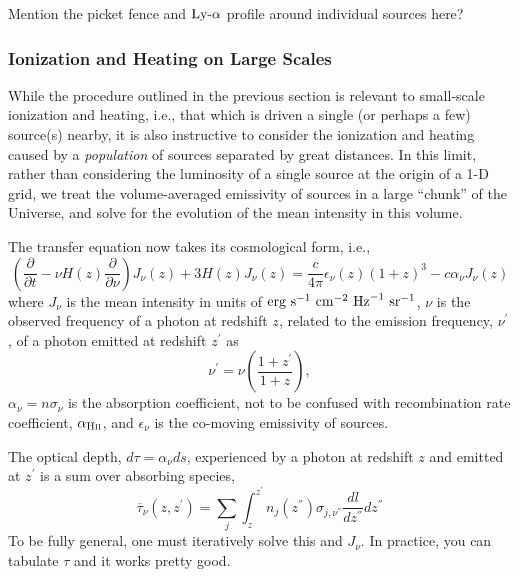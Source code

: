 {\color{red} Mention the picket fence and $\text{Ly-}\alpha$ profile around individual sources here?}

%



\subsubsection{Ionization and Heating on Large Scales} \label{sec:largescales}
While the procedure outlined in the previous section is relevant to small-scale ionization and heating, i.e., that which is driven a single (or perhaps a few) source(s) nearby, it is also instructive to consider the ionization and heating caused by a \textit{population} of sources separated by great distances. In this limit, rather than considering the luminosity of a single source at the origin of a 1-D grid, we treat the volume-averaged emissivity of sources in a large ``chunk'' of the Universe, and solve for the evolution of the mean intensity in this volume. 

The transfer equation now takes its cosmological form, i.e., 
\begin{equation}
    \left(\frac{\partial}{\partial t} - \nu H(z) \frac{\partial}{\partial \nu} \right) J_{\nu}(z) + 3 H(z) J_{\nu}(z) =  \frac{c}{4\pi} \epsilon_{\nu}(z) (1 + z)^3 - c \alpha_{\nu} J_{\nu}(z) \label{eq:rte_diffeq}
\end{equation}
where $J_{\nu}$ is the mean intensity in units of $\text{erg} \ \text{s}^{-1} \ \text{cm}^{-2} \ \mathrm{Hz}^{-1} \ \text{sr}^{-1}$, $\nu$ is the observed frequency of a photon at redshift $z$, related to the emission frequency, $\nu^{\prime}$, of a photon emitted at redshift $z^{\prime}$ as
\begin{equation}
    \nu^{\prime} = \nu \left(\frac{1 + z^{\prime}}{1 + z}\right) , \label{eq:EmissionFrequency}
\end{equation}
$\alpha_{\nu} = n \sigma_{\nu}$ is the absorption coefficient, not to be confused with recombination rate coefficient, $\alpha_{\text{H} {\textsc{ii}}}$, and $\epsilon_{\nu}$ is the co-moving emissivity of sources.

The optical depth, $d\tau = \alpha_{\nu} ds$, experienced by a photon at redshift $z$ and emitted at $z^{\prime}$ is a sum over absorbing species,
\begin{equation}
    \overline{\tau}_{\nu}(z, z^{\prime}) = \sum_j \int_{z}^{z^{\prime}} n_j(z^{\dprime}) \sigma_{j, \nu^{\dprime}} \frac{dl}{dz^{\dprime}}dz^{\dprime} \label{eq:tau_igm}
\end{equation}
To be fully general, one must iteratively solve this and $J_{\nu}$. In practice, you can tabulate $\tau$ and it works pretty good.

